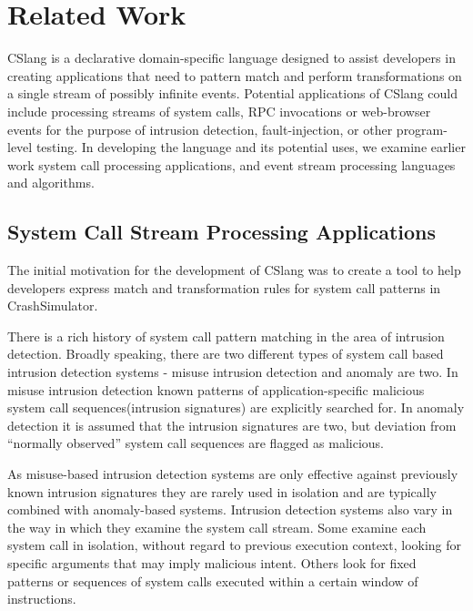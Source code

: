 \section{Related Work}
\label{SEC:related-work}

CSlang is a declarative domain-specific language designed to
assist developers in creating
applications that need to pattern match and perform
transformations on a single stream of possibly infinite events.
Potential applications
of CSlang could include
processing streams of system calls, RPC invocations or
web-browser events for the purpose of intrusion detection, fault-injection, or
other program-level testing.
In developing the language and its potential uses,
we examine
earlier work system call processing applications,
and event stream processing languages and algorithms.

\subsection{System Call Stream Processing Applications}
The
initial motivation for the development of CSlang was to create a tool to help
developers express match and transformation rules for system call patterns in
CrashSimulator\cite{DBLP:conf/issre/MooreCFW19}.

There is a rich history of system call pattern
matching in the area of intrusion detection.  Broadly speaking, there are two
different types of system call based intrusion detection systems - misuse
intrusion detection and anomaly are two. In misuse intrusion
detection known patterns of application-specific malicious system call
sequences(intrusion signatures) are explicitly searched for. In anomaly
detection it is assumed that the intrusion signatures are two, but deviation
from “normally observed” system call sequences are flagged as
malicious\cite{DBLP:conf/sp/ForrestHSL96}.

As misuse-based intrusion detection systems are only
effective against previously known intrusion signatures they are rarely used in
isolation and are typically combined with anomaly-based systems.
Intrusion
detection systems also vary in the way in which they examine the system call
stream.
Some examine each system call in isolation,
without regard to previous
execution context,
looking for specific arguments that may imply malicious
intent.
Others look for fixed patterns or sequences of system calls executed
within a certain window of instructions.

